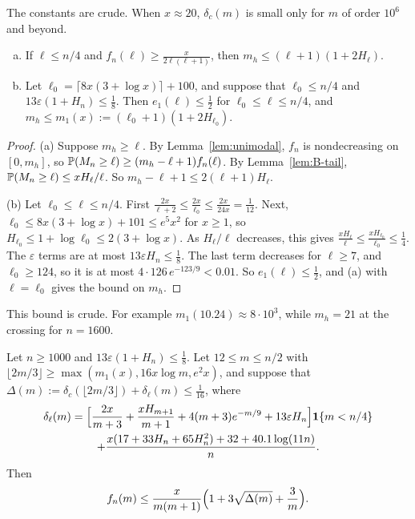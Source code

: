 The constants are crude. When $x\approx20$, $\delta_c(m)$ is small only for
$m$ of order $10^6$ and beyond.

\begin{lemma}\label{lem:B-mode}
\begin{enumerate}[(a)]
\item If $\ell\le n/4$ and $f_n(\ell)\ge\frac x{2\ell(\ell+1)}$, then
$m_h\le(\ell+1)(1+2H_\ell)$.
\item Let $\ell_0=\lceil8x(3+\log x)\rceil+100$, and suppose that
$\ell_0\le n/4$ and $13\varepsilon(1+H_n)\le\frac18$. Then $e_1(\ell)\le\frac12$
for $\ell_0\le\ell\le n/4$, and
$m_h\le m_1(x):=(\ell_0+1)(1+2H_{\ell_0})$.
\end{enumerate}
\end{lemma}

\begin{proof}
(a) Suppose $m_h\ge\ell$. By Lemma~\ref{lem:unimodal}, $f_n$ is
nondecreasing on $[0,m_h]$, so
$\mathbb{P}(M_n\ge\ell)\ge(m_h-\ell+1)f_n(\ell)$. By Lemma~\ref{lem:B-tail},
$\mathbb{P}(M_n\ge\ell)\le xH_\ell/\ell$. So $m_h-\ell+1\le2(\ell+1)H_\ell$.

(b) Let $\ell_0\le\ell\le n/4$. First
$\frac{2x}{\ell+2}\le\frac{2x}{\ell_0}\le\frac{2x}{24x}=\frac1{12}$. Next,
$\ell_0\le8x(3+\log x)+101\le e^5x^2$ for $x\ge1$, so
$H_{\ell_0}\le1+\log\ell_0\le2(3+\log x)$. As $H_\ell/\ell$ decreases, this
gives $\frac{xH_\ell}\ell\le\frac{xH_{\ell_0}}{\ell_0}\le\frac14$. The
$\varepsilon$ terms are at most $13\varepsilon H_n\le\frac18$. The last term
decreases for $\ell\ge7$, and $\ell_0\ge124$, so it is at most
$4\cdot126\,e^{-123/9}<0.01$. So $e_1(\ell)\le\frac12$, and (a) with
$\ell=\ell_0$ gives the bound on $m_h$.
\end{proof}

This bound is crude. For example $m_1(10.24)\approx8\cdot10^3$, while
$m_h=21$ at the crossing for $n=1600$.

\begin{theorem}\label{thm:B-local-upper}
Let $n\ge1000$ and $13\varepsilon(1+H_n)\le\frac18$. Let $12\le m\le n/2$
with $\lfloor2m/3\rfloor\ge\max(m_1(x),16x\log m,e^2x)$, and suppose that
$\Delta(m):=\delta_c(\lfloor2m/3\rfloor)+\delta_\ell(m)\le\frac1{16}$, where
\begin{multline*}
 \delta_\ell(m)=\Bigl[\frac{2x}{m+3}+\frac{xH_{m+1}}{m+1}+4(m+3)e^{-m/9}+13\varepsilon H_n\Bigr]\mathbf 1\{m<n/4\}\\
 +\frac{x(17+33H_n+65H_n^2)+32+40.1\log(11n)}n.
\end{multline*}
Then
\[
 f_n(m)\le\frac{x}{m(m+1)}\Bigl(1+3\sqrt{\Delta(m)}+\frac3m\Bigr).
\]
\end{theorem}

